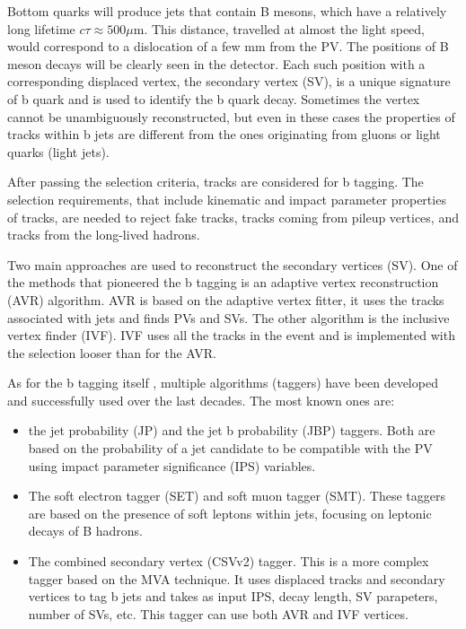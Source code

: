 \begin{small}
Bottom quarks will produce jets that contain B mesons, which have a relatively long lifetime $c \tau \approx 500 \mu$m. This distance, travelled at almost the light speed, would correspond to a dislocation of a few mm from the PV. The positions of B meson decays will be clearly seen in the detector. Each such position with a corresponding displaced vertex, the secondary vertex (SV), is a unique signature of b quark and is used to identify the b quark decay. Sometimes the vertex cannot be unambiguously reconstructed, but even in these cases the properties of tracks within b jets are different from the ones originating from gluons or light quarks (light jets).

After passing the selection criteria, tracks are considered for b tagging. The selection requirements, that include kinematic and impact parameter properties of tracks, are needed to reject fake tracks, tracks coming from pileup vertices, and tracks from the long-lived hadrons. 

Two main approaches are used to reconstruct the secondary vertices (SV). One of the methods that pioneered the b tagging is an adaptive vertex reconstruction (AVR) algorithm. AVR is based on the adaptive vertex fitter, it uses the tracks associated with jets and finds PVs and SVs. The other algorithm is the inclusive vertex finder (IVF). IVF uses all the tracks in the event and is implemented with the selection looser than for the AVR. 

As for the b tagging itself \cite{CMS-PAS-BTV-15-001, Sirunyan:2017ezt}, multiple algorithms (taggers) have been developed and successfully used over the last decades. The most known ones are: 

\begin{itemize}
\item the jet probability (JP) and the jet b probability (JBP) taggers. Both are based on the probability of a jet candidate to be compatible with the PV using impact parameter significance (IPS) variables.
\item The soft electron tagger (SET) and soft muon tagger (SMT). These taggers are based on the presence of soft leptons within jets, focusing on leptonic decays of B hadrons.
\item The combined secondary vertex (CSVv2) tagger. This is a more complex tagger based on the MVA technique. It uses displaced tracks and secondary vertices to tag b jets and takes as input IPS, decay length, SV parapeters, number of SVs, etc. This tagger can use both AVR and IVF vertices.
\end{itemize}


\end{small}
